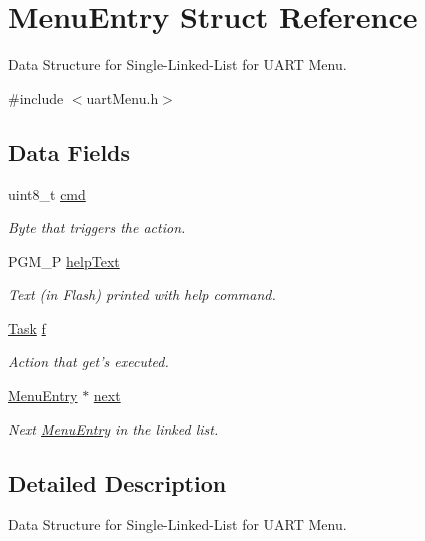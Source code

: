 \hypertarget{struct_menu_entry}{\section{Menu\-Entry Struct Reference}
\label{struct_menu_entry}
}


Data Structure for Single-\/\-Linked-\/\-List for U\-A\-R\-T Menu.  




{\ttfamily \#include $<$uart\-Menu.\-h$>$}

\subsection*{Data Fields}
\begin{DoxyCompactItemize}
\item 
uint8\-\_\-t \hyperlink{struct_menu_entry_a4d43e8212bdc9dbee866506f04effcea}{cmd}
\begin{DoxyCompactList}\small\item\em Byte that triggers the action. \end{DoxyCompactList}\item 
P\-G\-M\-\_\-\-P \hyperlink{struct_menu_entry_a2044142917d83a3df85815bb99dd115f}{help\-Text}
\begin{DoxyCompactList}\small\item\em Text (in Flash) printed with help command. \end{DoxyCompactList}\item 
\hyperlink{group__task_gaa9c5b8d3ac838189ed335dbe4ec9fa6b}{Task} \hyperlink{struct_menu_entry_afe96196d3564b9577477236d13329241}{f}
\begin{DoxyCompactList}\small\item\em Action that get's executed. \end{DoxyCompactList}\item 
\hyperlink{struct_menu_entry}{Menu\-Entry} $\ast$ \hyperlink{struct_menu_entry_af79f4060fda1c0b572c15c3dd99b09a5}{next}
\begin{DoxyCompactList}\small\item\em Next \hyperlink{struct_menu_entry}{Menu\-Entry} in the linked list. \end{DoxyCompactList}\end{DoxyCompactItemize}


\subsection{Detailed Description}
Data Structure for Single-\/\-Linked-\/\-List for U\-A\-R\-T Menu. 

